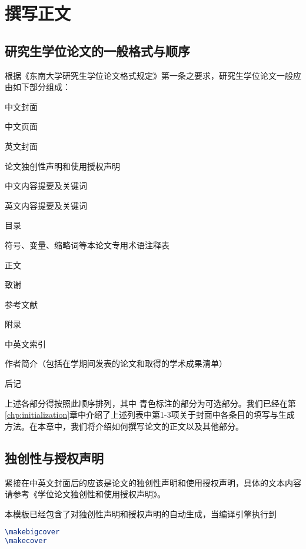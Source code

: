 \chapter{撰写正文}

\section{研究生学位论文的一般格式与顺序}

根据《东南大学研究生学位论文格式规定》\cite{seugs2015rule}第一条之要求，研究生学位论文一般应由如下部分组成：

\begin{enumerate}
  \item 中文封面
  \item 中文页面
  \item 英文封面
  \item 论文独创性声明和使用授权声明
  \item 中文内容提要及关键词
  \item 英文内容提要及关键词
  \item 目录
  {\color{cyan} \item 符号、变量、缩略词等本论文专用术语注释表}
  \item 正文
  \item 致谢
  \item 参考文献
  {\color{cyan} \item 附录
  \item 中英文索引
  \item 作者简介（包括在学期间发表的论文和取得的学术成果清单）
  \item 后记}
\end{enumerate}
上述各部分得按照此顺序排列，其中{\color{cyan} 青色}标注的部分为可选部分。我们已经在第\ref{chp:initialization}章中介绍了上述列表中第1-3项关于封面中各条目的填写与生成方法。在本章中，我们将介绍如何撰写论文的正文以及其他部分。

\section{独创性与授权声明}

紧接在中英文封面后的应该是论文的独创性声明和使用授权声明，具体的文本内容请参考《学位论文独创性和使用授权声明》\cite{seugs2018license}。

本模板已经包含了对独创性声明和授权声明的自动生成，当编译引擎执行到

\begin{tcolorbox}
\begin{lstlisting}[language=TeX]
\makebigcover
\makecover
\end{lstlisting}
\end{tcolorbox}

